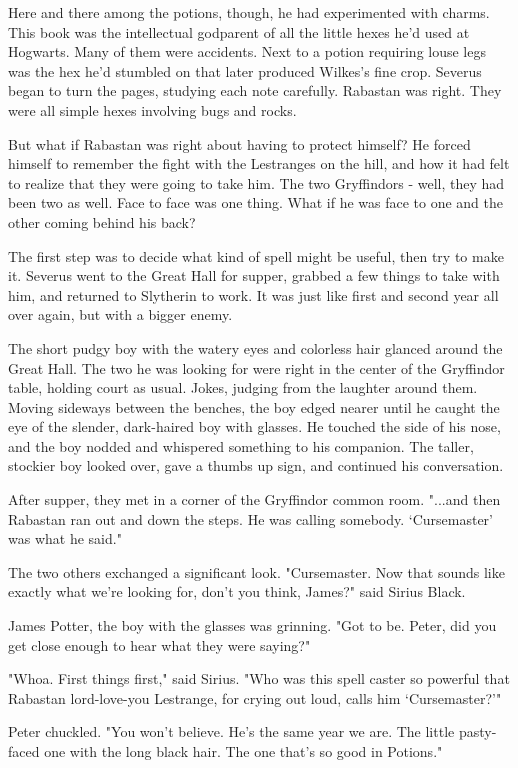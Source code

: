 Here and there among the potions, though, he had experimented with charms. This book was the intellectual godparent of all the little hexes he'd used at Hogwarts. Many of them were accidents. Next to a potion requiring louse legs was the hex he'd stumbled on that later produced Wilkes's fine crop. Severus began to turn the pages, studying each note carefully. Rabastan was right. They were all simple hexes involving bugs and rocks.

But what if Rabastan was right about having to protect himself? He forced himself to remember the fight with the Lestranges on the hill, and how it had felt to realize that they were going to take him. The two Gryffindors - well, they had been two as well. Face to face was one thing. What if he was face to one and the other coming behind his back?

The first step was to decide what kind of spell might be useful, then try to make it. Severus went to the Great Hall for supper, grabbed a few things to take with him, and returned to Slytherin to work. It was just like first and second year all over again, but with a bigger enemy.

The short pudgy boy with the watery eyes and colorless hair glanced around the Great Hall. The two he was looking for were right in the center of the Gryffindor table, holding court as usual. Jokes, judging from the laughter around them. Moving sideways between the benches, the boy edged nearer until he caught the eye of the slender, dark-haired boy with glasses. He touched the side of his nose, and the boy nodded and whispered something to his companion. The taller, stockier boy looked over, gave a thumbs up sign, and continued his conversation.

After supper, they met in a corner of the Gryffindor common room. "...and then Rabastan ran out and down the steps. He was calling somebody. `Cursemaster' was what he said."

The two others exchanged a significant look. "Cursemaster. Now that sounds like exactly what we're looking for, don't you think, James?" said Sirius Black.

James Potter, the boy with the glasses was grinning. "Got to be. Peter, did you get close enough to hear what they were saying?"

"Whoa. First things first," said Sirius. "Who was this spell caster so powerful that Rabastan lord-love-you Lestrange, for crying out loud, calls him `Cursemaster?'"

Peter chuckled. "You won't believe. He's the same year we are. The little pasty-faced one with the long black hair. The one that's so good in Potions."

